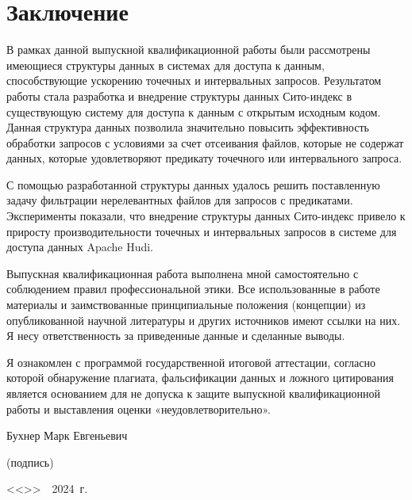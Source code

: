 \section*{Заключение}

В рамках данной выпускной квалификационной работы были рассмотрены имеющиеся структуры данных в системах для доступа к данным, способствующие ускорению точечных и интервальных запросов. Результатом работы стала разработка и внедрение структуры данных Сито-индекс в существующую систему для доступа к данным с открытым исходным кодом. Данная структура данных позволила значительно повысить эффективность обработки запросов с условиями за счет отсеивания файлов, которые не содержат данных, которые удовлетворяют предикату точечного или интервального запроса.

С помощью разработанной структуры данных удалось решить поставленную задачу фильтрации нерелевантных файлов для запросов с предикатами. Эксперименты показали, что внедрение структуры данных Сито-индекс привело к приросту производительности точечных и интервальных запросов в системе для доступа данных Apache Hudi.

Выпускная квалификационная работа выполнена мной самостоятельно с соблюдением правил профессиональной этики. Все использованные в работе материалы и заимствованные принципиальные положения (концепции) из опубликованной научной литературы и других источников имеют ссылки на них. Я несу ответственность за приведенные данные и сделанные выводы.

Я ознакомлен с программой государственной итоговой аттестации, согласно которой обнаружение плагиата, фальсификации данных и ложного цитирования является основанием для не допуска к защите выпускной квалификационной работы и выставления оценки «неудовлетворительно».

\vspace{3em}
\noindent
Бухнер Марк Евгеньевич \hspace*{\fill} \makebox[5cm]{\hrulefill}\\
\vspace{-3em}
\begin{flushright}
			\footnotesize (подпись)~~~~~~~~~~~~~~~
\end{flushright}

\noindent
<<\makebox[0.7cm]{\hrulefill}>>~\makebox[3cm]{\hrulefill}~2024~г. 

